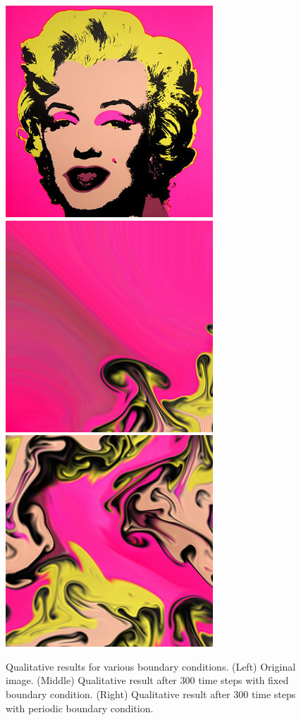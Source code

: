 \documentclass[sigconf]{acmart}
\begin{document}
\begin{figure}
    \centering
    \includegraphics[width=0.32\linewidth]{figs/monroe.jpeg}
    \includegraphics[width=0.32\linewidth]{figs/monroe_fixed.png}
    \includegraphics[width=0.32\linewidth]{figs/monroe_periodic.png}
    \caption{Qualitative results for various boundary conditions. (Left) Original image. (Middle) Qualitative result after 300 time steps with fixed boundary condition. (Right) Qualitative result after 300 time steps with periodic boundary condition.
    \label{fig:boundary-condition}}
\end{figure}
\end{document}
